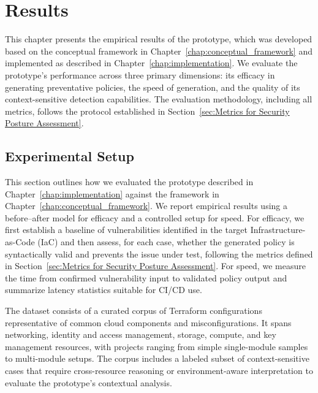 
\chapter{Results}\label{chap:results}

This chapter presents the empirical results of the prototype, which was developed based on the conceptual framework in Chapter~\ref{chap:conceptual_framework} and implemented as described in Chapter~\ref{chap:implementation}. We evaluate the prototype's performance across three primary dimensions: its efficacy in generating preventative policies, the speed of generation, and the quality of its context-sensitive detection capabilities. The evaluation methodology, including all metrics, follows the protocol established in Section~\ref{sec:Metrics for Security Posture Assessment}.

\section{Experimental Setup}\label{sec:experimental-setup}

This section outlines how we evaluated the prototype described in Chapter~\ref{chap:implementation} against the framework in Chapter~\ref{chap:conceptual_framework}. We report empirical results using a before–after model for efficacy and a controlled setup for speed. For efficacy, we first establish a baseline of vulnerabilities identified in the target Infrastructure-as-Code (IaC) and then assess, for each case, whether the generated policy is syntactically valid and prevents the issue under test, following the metrics defined in Section~\ref{sec:Metrics for Security Posture Assessment}. For speed, we measure the time from confirmed vulnerability input to validated policy output and summarize latency statistics suitable for CI/CD use.

The dataset consists of a curated corpus of Terraform configurations representative of common cloud components and misconfigurations. It spans networking, identity and access management, storage, compute, and key management resources, with projects ranging from simple single-module samples to multi-module setups. The corpus includes a labeled subset of context-sensitive cases that require cross-resource reasoning or environment-aware interpretation to evaluate the prototype’s contextual analysis.

